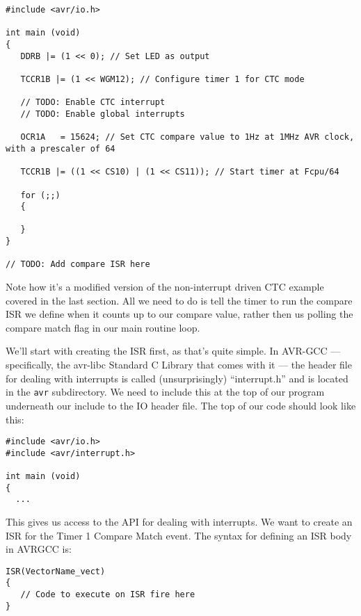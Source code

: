\documentclass[a4paper,oneside,notitlepage]{book}
\begin{document}
\begin{center}
\begin{lstlisting}
#include <avr/io.h>

int main (void)
{
   DDRB |= (1 << 0); // Set LED as output

   TCCR1B |= (1 << WGM12); // Configure timer 1 for CTC mode

   // TODO: Enable CTC interrupt
   // TODO: Enable global interrupts

   OCR1A   = 15624; // Set CTC compare value to 1Hz at 1MHz AVR clock, with a prescaler of 64

   TCCR1B |= ((1 << CS10) | (1 << CS11)); // Start timer at Fcpu/64

   for (;;)
   {

   }
}

// TODO: Add compare ISR here
\end{lstlisting}
\end{center}

Note how it's a modified version of the non-interrupt driven CTC example covered in the last section. All we need to do is tell the timer to run the compare ISR we define when it counts up to our compare value, rather then us polling the compare match flag in our main routine loop.

We'll start with creating the ISR first, as that's quite simple. In AVR-GCC --- specifically, the avr-libc Standard C Library that comes with it --- the header file for dealing with interrupts is called (unsurprisingly) ``interrupt.h'' and is located in the \texttt{avr} subdirectory. We need to include this at the top of our program underneath our include to the IO header file. The top of our code should look like this:

\begin{center}
\begin{lstlisting}
#include <avr/io.h>
#include <avr/interrupt.h>

int main (void)
{
  ...
\end{lstlisting}
\end{center}

This gives us access to the API for dealing with interrupts. We want to create an ISR for the Timer 1 Compare Match event. The syntax for defining an ISR body in AVRGCC is:

\begin{center}
\begin{lstlisting}
ISR(VectorName_vect)
{
   // Code to execute on ISR fire here
}
\end{lstlisting}
\end{center}
\end{document}
